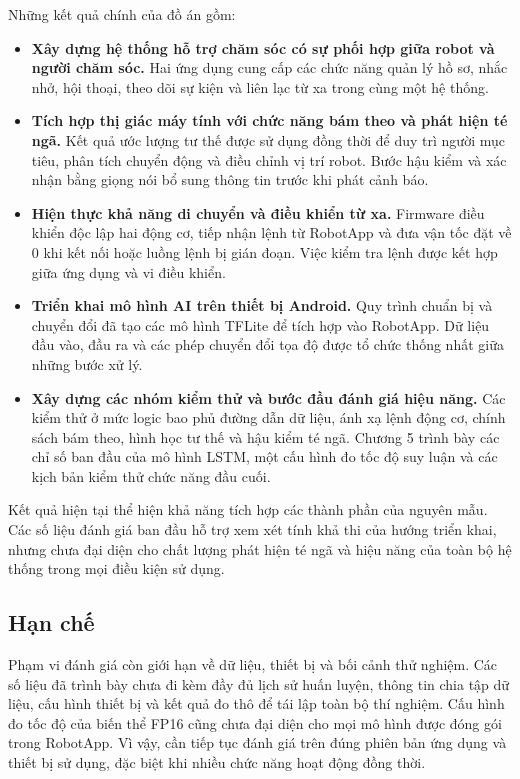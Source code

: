 Những kết quả chính của đồ án gồm:
\begin{itemize}
    \item \textbf{Xây dựng hệ thống hỗ trợ chăm sóc có sự phối hợp giữa robot và người chăm sóc.} Hai ứng dụng cung cấp các chức năng quản lý hồ sơ, nhắc nhở, hội thoại, theo dõi sự kiện và liên lạc từ xa trong cùng một hệ thống.
    \item \textbf{Tích hợp thị giác máy tính với chức năng bám theo và phát hiện té ngã.} Kết quả ước lượng tư thế được sử dụng đồng thời để duy trì người mục tiêu, phân tích chuyển động và điều chỉnh vị trí robot. Bước hậu kiểm và xác nhận bằng giọng nói bổ sung thông tin trước khi phát cảnh báo.
    \item \textbf{Hiện thực khả năng di chuyển và điều khiển từ xa.} Firmware điều khiển độc lập hai động cơ, tiếp nhận lệnh từ RobotApp và đưa vận tốc đặt về 0 khi kết nối hoặc luồng lệnh bị gián đoạn. Việc kiểm tra lệnh được kết hợp giữa ứng dụng và vi điều khiển.
    \item \textbf{Triển khai mô hình AI trên thiết bị Android.} Quy trình chuẩn bị và chuyển đổi đã tạo các mô hình TFLite để tích hợp vào RobotApp. Dữ liệu đầu vào, đầu ra và các phép chuyển đổi tọa độ được tổ chức thống nhất giữa những bước xử lý.
    \item \textbf{Xây dựng các nhóm kiểm thử và bước đầu đánh giá hiệu năng.} Các kiểm thử ở mức logic bao phủ đường dẫn dữ liệu, ánh xạ lệnh động cơ, chính sách bám theo, hình học tư thế và hậu kiểm té ngã. Chương 5 trình bày các chỉ số ban đầu của mô hình LSTM, một cấu hình đo tốc độ suy luận và các kịch bản kiểm thử chức năng đầu cuối.
\end{itemize}

Kết quả hiện tại thể hiện khả năng tích hợp các thành phần của nguyên mẫu. Các số liệu đánh giá ban đầu hỗ trợ xem xét tính khả thi của hướng triển khai, nhưng chưa đại diện cho chất lượng phát hiện té ngã và hiệu năng của toàn bộ hệ thống trong mọi điều kiện sử dụng.

\subsection{Hạn chế}

Phạm vi đánh giá còn giới hạn về dữ liệu, thiết bị và bối cảnh thử nghiệm. Các số liệu đã trình bày chưa đi kèm đầy đủ lịch sử huấn luyện, thông tin chia tập dữ liệu, cấu hình thiết bị và kết quả đo thô để tái lập toàn bộ thí nghiệm. Cấu hình đo tốc độ của biến thể FP16 cũng chưa đại diện cho mọi mô hình được đóng gói trong RobotApp. Vì vậy, cần tiếp tục đánh giá trên đúng phiên bản ứng dụng và thiết bị sử dụng, đặc biệt khi nhiều chức năng hoạt động đồng thời.


